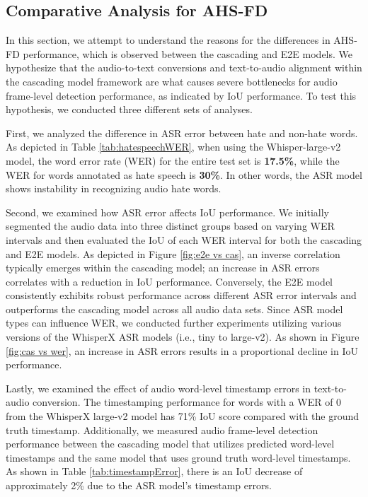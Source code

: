 \documentclass[11pt]{article}
\begin{document}
\subsection{Comparative Analysis for AHS-FD}
In this section, we attempt to understand the reasons for the differences in AHS-FD performance, which is observed between the cascading and E2E models. We hypothesize that the audio-to-text conversions and text-to-audio alignment within the cascading model framework are what causes severe bottlenecks for audio frame-level detection performance, as indicated by IoU performance. To test this hypothesis, we conducted three different sets of analyses.

First, we analyzed the difference in ASR error between hate and non-hate words. As depicted in Table \ref{tab:hatespeechWER}, when using the Whisper-large-v2 model, the word error rate (WER) for the entire test set is \textbf{17.5\%}, while the WER for words annotated as hate speech is \textbf{30\%}. In other words, the ASR model shows instability in recognizing audio hate words.

Second, we examined how ASR error affects IoU performance. We initially segmented the audio data into three distinct groups based on varying WER intervals and then evaluated the IoU of each WER interval for both the cascading and E2E models. As depicted in Figure \ref{fig:e2e vs cas}, an inverse correlation typically emerges within the cascading model; an increase in ASR errors correlates with a reduction in IoU performance. Conversely, the E2E model consistently exhibits robust performance across different ASR error intervals and outperforms the cascading model across all audio data sets.
Since ASR model types can influence WER, we conducted further experiments utilizing various versions of the WhisperX ASR models (i.e., tiny to large-v2). As shown in Figure \ref{fig:cas vs wer}, an increase in ASR errors results in a proportional decline in IoU performance.

Lastly, we examined the effect of audio word-level timestamp errors in text-to-audio conversion. The timestamping performance for words with a WER of 0 from the WhisperX large-v2 model has 71\% IoU score compared with the ground truth timestamp. Additionally, we measured audio frame-level detection performance between the cascading model that utilizes predicted word-level timestamps and the same model that uses ground truth word-level timestamps. As shown in Table \ref{tab:timestampError}, there is an IoU decrease of approximately 2\% due to the ASR model's timestamp errors.
\end{document}
